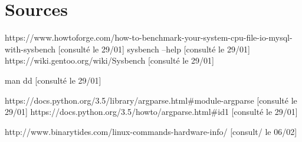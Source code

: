 \section{Sources}

https://www.howtoforge.com/how-to-benchmark-your-system-cpu-file-io-mysql-with-sysbench [consulté le 29/01]
sysbench --help [consulté le 29/01]
https://wiki.gentoo.org/wiki/Sysbench [consulté le 29/01]

man dd [consulté le 29/01]

https://docs.python.org/3.5/library/argparse.html#module-argparse [consulté le 29/01]
https://docs.python.org/3.5/howto/argparse.html#id1 [consulté le 29/01]

http://www.binarytides.com/linux-commands-hardware-info/ [consult/ le 06/02]
